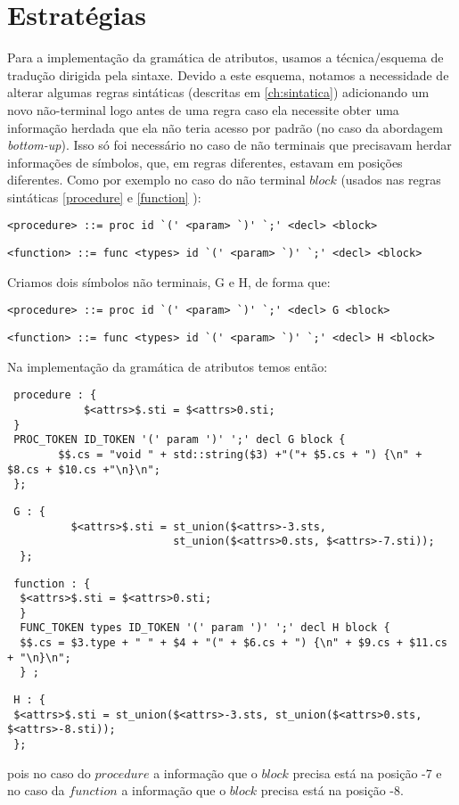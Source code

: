 \section{Estratégias}
Para a implementação da gramática de atributos, usamos a técnica/esquema de tradução dirigida pela sintaxe. Devido a este esquema, notamos a necessidade de alterar algumas regras sintáticas (descritas em \ref{ch:sintatica}) adicionando um novo não-terminal logo antes de uma regra caso ela necessite obter uma informação herdada que ela não teria acesso por padrão (no caso da abordagem \textit{bottom-up}). Isso só foi necessário no caso de não terminais que precisavam herdar informações de símbolos, que,  em regras diferentes, estavam em posições diferentes. Como por exemplo no caso do não terminal $block$ (usados nas regras sintáticas \ref{procedure} e \ref{function}  ):

\begin{lstlisting}[frame=single, language=pie]
<procedure> ::= proc id `(' <param> `)' `;' <decl> <block>
\end{lstlisting}

\begin{lstlisting}[frame=single, language=pie]
<function> ::= func <types> id `(' <param> `)' `;' <decl> <block>
\end{lstlisting}
 Criamos dois símbolos não terminais, G e H, de forma que:
 \begin{lstlisting}[frame=single, language=pie]
 <procedure> ::= proc id `(' <param> `)' `;' <decl> G <block>
 \end{lstlisting}
 
 \begin{lstlisting}[frame=single, language=pie, basicstyle=\small ]
 <function> ::= func <types> id `(' <param> `)' `;' <decl> H <block>
  \end{lstlisting}
  
  Na implementação da gramática de atributos temos então:
 
 \begin{verbatim}
 procedure : {
 			$<attrs>$.sti = $<attrs>0.sti; 
 }
 PROC_TOKEN ID_TOKEN '(' param ')' ';' decl G block {
 		$$.cs = "void " + std::string($3) +"("+ $5.cs + ") {\n" + $8.cs + $10.cs +"\n}\n";
 };
  \end{verbatim}
  \begin{verbatim}
 G : {
		  $<attrs>$.sti = st_union($<attrs>-3.sts,
		                  st_union($<attrs>0.sts, $<attrs>-7.sti)); 
  };
  \end{verbatim}
  \begin{verbatim}
 function : {
  $<attrs>$.sti = $<attrs>0.sti; 
  }
  FUNC_TOKEN types ID_TOKEN '(' param ')' ';' decl H block {
  $$.cs = $3.type + " " + $4 + "(" + $6.cs + ") {\n" + $9.cs + $11.cs + "\n}\n"; 
  } ;
  \end{verbatim}
  \begin{verbatim}
 H : { 
 $<attrs>$.sti = st_union($<attrs>-3.sts, st_union($<attrs>0.sts, $<attrs>-8.sti)); 
 };
 \end{verbatim}
pois no caso do $procedure$ a informação que o $block$ precisa está na posição -7 e no caso da $function$ a informação que o $block$ precisa está na posição -8.

